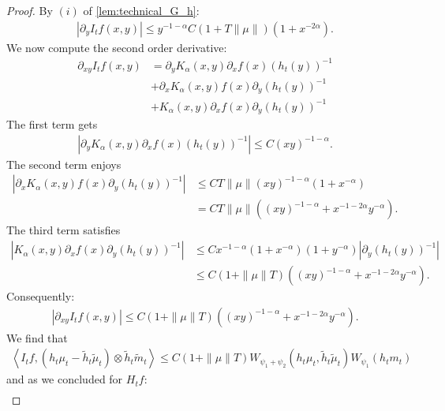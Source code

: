 \documentclass[11pt,a4paper]{article}
\newcommand{\brac}[1]{\left\langle#1\right\rangle}
\begin{document}
\begin{proof}
    By $(i)$ of \ref{lem:technical_G_h}:
    \begin{align*}
        \left|\partial_y I_tf(x,y)  \right| \leq y^{-1-\alpha} C(1 + T\|\mu\|)\left(1 + x^{-2\alpha} \right).
    \end{align*}  
    We now compute the second order derivative:
    \begin{align*}
        \partial_{xy} I_tf(x,y) &= \partial_y K_\alpha(x,y) \partial_x f(x)\left(h_t(y)\right)^{-1} \\
        &+ \partial_x K_\alpha(x,y) f(x) \partial_y \left(h_t(y)\right)^{-1} \\
        &+ K_\alpha(x,y)  \partial_x f(x) \partial_y \left(h_t(y)\right)^{-1}
    \end{align*}
    The first term gets
    \begin{align*}
        \left|\partial_y K_\alpha(x,y) \partial_x f(x)\left(h_t(y)\right)^{-1}  \right| \leq C (xy)^{-1-\alpha}.
    \end{align*}
    The second term enjoys
    \begin{align*}
        \left| \partial_x K_\alpha(x,y) f(x) \partial_y \left(h_t(y)\right)^{-1} \right| 
        &\leq CT\|\mu\| (xy)^{-1-\alpha} (1 + x^{-\alpha}) \\
        &= CT\|\mu\| \left((xy)^{-1-\alpha} + x^{-1-2\alpha}y^{-\alpha}\right).
    \end{align*}
    The third term satisfies
    \begin{align*}
        \left|K_\alpha(x,y)  \partial_x f(x) \partial_y \left(h_t(y)\right)^{-1}\right| 
        &\leq Cx^{-1-\alpha}(1 + x^{-\alpha})(1 + y^{-\alpha})\left| \partial_y \left(h_t(y)\right)^{-1}\right|\\
        &\leq C(1 + \|\mu\|T) \left((xy)^{-1-\alpha} + x^{-1-2\alpha}y^{-\alpha}\right).
    \end{align*}
    Consequently:
    \begin{align*}
        \left| \partial_{xy} I_tf(x,y)\right| \leq C(1 + \|\mu\|T) \left((xy)^{-1-\alpha} + x^{-1-2\alpha}y^{-\alpha}\right).
    \end{align*}
    We find that 
    \begin{align*}
        \brac{I_tf,\left(h_t\mu_t - \tilde{h}_t\tilde{\mu}_t\right)\otimes \tilde{h}_t\tilde{m}_t}  \leq C\left(1 + \|\mu\|T\right)W_{\psi_1 + \psi_2}\left( h_t\mu_t , \tilde{h}_t\tilde{\mu}_t\right)W_{\psi_1}\left(h_t m_t \right)
    \end{align*}
    and as we concluded for $H_tf$:
    \begin{align*}

\end{align*}
\end{proof}
\end{document}
